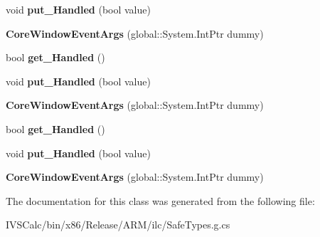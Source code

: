 \begin{DoxyCompactItemize}
void {\bfseries put\+\_\+\+Handled} (bool value)
\item 
\mbox{\label{class_windows_1_1_u_i_1_1_core_1_1_core_window_event_args_acd056e2de4d7459f41073ab00a5d9ceb}} 
{\bfseries Core\+Window\+Event\+Args} (global\+::\+System.\+Int\+Ptr dummy)
\item 
\mbox{\label{class_windows_1_1_u_i_1_1_core_1_1_core_window_event_args_a109975b3b2a6a0dd45673111f695088b}} 
bool {\bfseries get\+\_\+\+Handled} ()
\item 
\mbox{\label{class_windows_1_1_u_i_1_1_core_1_1_core_window_event_args_a66fecd50e07d8c39c5e24f6a2426d981}} 
void {\bfseries put\+\_\+\+Handled} (bool value)
\item 
\mbox{\label{class_windows_1_1_u_i_1_1_core_1_1_core_window_event_args_acd056e2de4d7459f41073ab00a5d9ceb}} 
{\bfseries Core\+Window\+Event\+Args} (global\+::\+System.\+Int\+Ptr dummy)
\item 
\mbox{\label{class_windows_1_1_u_i_1_1_core_1_1_core_window_event_args_a109975b3b2a6a0dd45673111f695088b}} 
bool {\bfseries get\+\_\+\+Handled} ()
\item 
\mbox{\label{class_windows_1_1_u_i_1_1_core_1_1_core_window_event_args_a66fecd50e07d8c39c5e24f6a2426d981}} 
void {\bfseries put\+\_\+\+Handled} (bool value)
\item 
\mbox{\label{class_windows_1_1_u_i_1_1_core_1_1_core_window_event_args_acd056e2de4d7459f41073ab00a5d9ceb}} 
{\bfseries Core\+Window\+Event\+Args} (global\+::\+System.\+Int\+Ptr dummy)
\end{DoxyCompactItemize}


The documentation for this class was generated from the following file\+:\begin{DoxyCompactItemize}
\item 
I\+V\+S\+Calc/bin/x86/\+Release/\+A\+R\+M/ilc/Safe\+Types.\+g.\+cs\end{DoxyCompactItemize}

